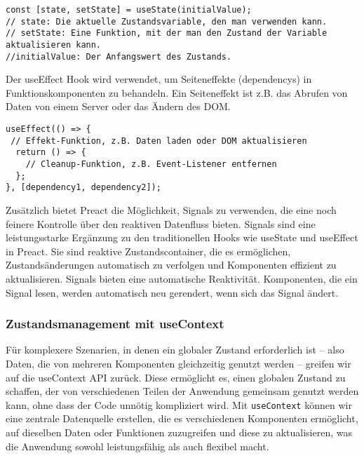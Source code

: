\begin{lstlisting}
const [state, setState] = useState(initialValue);
// state: Die aktuelle Zustandsvariable, den man verwenden kann.
// setState: Eine Funktion, mit der man den Zustand der Variable aktualisieren kann.
//initialValue: Der Anfangswert des Zustands.

\end{lstlisting}


Der useEffect Hook wird verwendet, um Seiteneffekte (dependencys) in Funktionskomponenten zu behandeln. Ein Seiteneffekt ist z.B. das Abrufen von Daten von einem Server oder das Ändern des DOM.

\begin{lstlisting}
useEffect(() => {
 // Effekt-Funktion, z.B. Daten laden oder DOM aktualisieren
  return () => {
    // Cleanup-Funktion, z.B. Event-Listener entfernen
  };
}, [dependency1, dependency2]);

\end{lstlisting}
  


Zusätzlich bietet Preact die Möglichkeit, Signals zu verwenden, die eine noch feinere Kontrolle über den reaktiven Datenfluss bieten.
Signals sind eine leistungsstarke Ergänzung zu den traditionellen Hooks wie useState und useEffect in Preact. Sie sind reaktive Zustandscontainer, die es ermöglichen, Zustandsänderungen automatisch zu verfolgen und Komponenten effizient zu aktualisieren. Signals bieten eine automatische Reaktivität. Komponenten, die ein Signal lesen, werden automatisch neu gerendert, wenn sich das Signal ändert.

\subsubsection{Zustandsmanagement mit useContext } 

Für komplexere Szenarien, in denen ein globaler Zustand erforderlich ist – also Daten, die von mehreren Komponenten gleichzeitig genutzt werden – greifen wir auf die useContext API zurück. Diese ermöglicht es, einen globalen Zustand zu schaffen, der von verschiedenen Teilen der Anwendung gemeinsam genutzt werden kann, ohne dass der Code unnötig kompliziert wird. Mit \texttt{useContext} können wir eine zentrale Datenquelle erstellen, die es verschiedenen Komponenten ermöglicht, auf dieselben Daten oder Funktionen zuzugreifen und diese zu aktualisieren, was die Anwendung sowohl leistungsfähig als auch flexibel macht.

